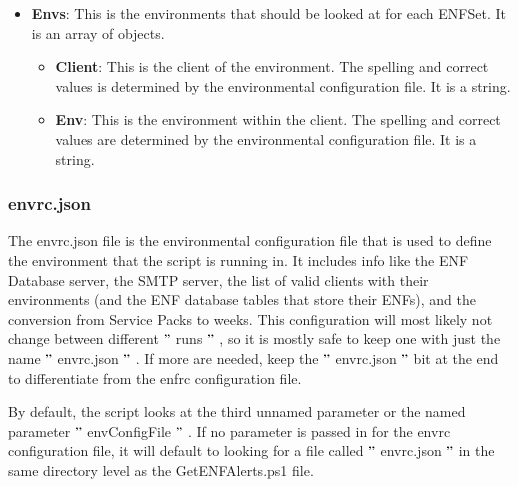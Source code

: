 \documentclass[a4paper,12pt]{report}
\begin{document}
\begin{itemize}
\item \textbf{Envs}: This is the environments that should be looked at for each ENFSet. It is an array of objects. \par
\begin{itemize}
\item \textbf{Client}: This is the client of the environment. The spelling and correct values is determined by the environmental configuration file. It is a string. \par
\item \textbf{Env}: This is the environment within the client. The spelling and correct values are determined by the environmental configuration file. It is a string. \par
\end{itemize}
\end{itemize}
\subsubsection*{envrc.json}
 \par
The envrc.json file is the environmental configuration file that is used to define the environment that the script is running in. It includes info like the ENF Database server, the SMTP server, the list of valid clients with their environments (and the ENF database tables that store their ENFs), and the conversion from Service Packs to weeks. This configuration will most likely not change between different  $ " $ runs $ " $ , so it is mostly safe to keep one with just the name  $ " $ envrc.json $ " $ . If more are needed, keep the  $ " $ envrc.json $ " $  bit at the end to differentiate from the enfrc configuration file. \par
By default, the script looks at the third unnamed parameter or the named parameter  $ " $ envConfigFile $ " $ . If no parameter is passed in for the envrc configuration file, it will default to looking for a file called  $ " $ envrc.json $ " $  in the same directory level as the GetENFAlerts.ps1 file. \par
\end{document}
